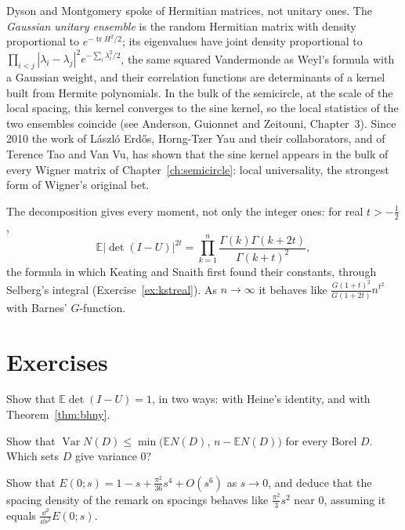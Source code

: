 \begin{remark}
Dyson and Montgomery spoke of Hermitian matrices, not unitary ones. The \emph{Gaussian unitary ensemble} is the random Hermitian matrix with density proportional to $e^{-\operatorname{tr}H^2/2}$; its eigenvalues have joint density proportional to
$\prod_{i<j}|\lambda_i-\lambda_j|^2e^{-\sum_i\lambda_i^2/2}$, the same squared Vandermonde as Weyl's formula with a Gaussian weight, and their correlation functions are determinants of a kernel built from Hermite polynomials. In the bulk of the
semicircle, at the scale of the local spacing, this kernel converges to the sine kernel, so the local statistics of the two ensembles coincide (see Anderson, Guionnet and Zeitouni, Chapter~3). Since 2010 the work of
L\'aszl\'o Erd\H os, Horng-Tzer Yau and their collaborators, and of Terence Tao and Van Vu, has shown that the sine kernel appears in the bulk of every Wigner matrix of Chapter~\ref{ch:semicircle}: local universality, the strongest form of
Wigner's original bet.
\end{remark}

\begin{remark}
The decomposition gives every moment, not only the integer ones: for real $t>-\frac12$,
\[
\mathbb E|\det(I-U)|^{2t}=\prod_{k=1}^n\frac{\Gamma(k)\Gamma(k+2t)}{\Gamma(k+t)^2},
\]
the formula in which Keating and Snaith first found their constants, through Selberg's integral (Exercise~\ref{ex:kstreal}). As $n\to\infty$ it behaves like $\frac{G(1+t)^2}{G(1+2t)}n^{t^2}$ with Barnes' $G$-function.
\end{remark}

\section{Exercises}

\begin{exercise}[$\star$]\label{ex:meandet}
Show that $\mathbb E\det(I-U)=1$, in two ways: with Heine's identity, and with Theorem~\ref{thm:bhny}.
\end{exercise}

\begin{exercise}[$\star$]\label{ex:varbound}
Show that $\operatorname{Var}N(D)\le\min\bigl(\mathbb EN(D),\,n-\mathbb EN(D)\bigr)$ for every Borel $D$. Which sets $D$ give variance $0$?
\end{exercise}

\begin{exercise}[$\star\star$]\label{ex:smallgap}
Show that $E(0;s)=1-s+\frac{\pi^2}{36}s^4+O(s^6)$ as $s\to0$, and deduce that the spacing density of the remark on spacings behaves like $\frac{\pi^2}3s^2$ near $0$, assuming it equals $\frac{\dd^2}{\dd s^2}E(0;s)$.
\end{exercise}

